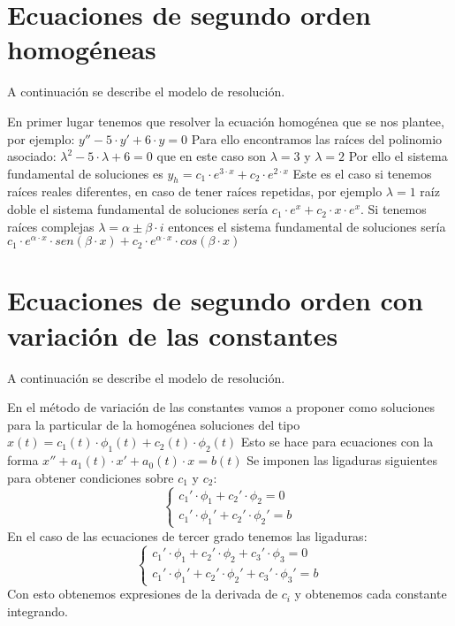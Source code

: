 
\section{Ecuaciones de segundo orden homogéneas}

\begin{ejer}
	A continuación se describe el modelo de resolución.
\end{ejer}
\begin{sol}
	En primer lugar tenemos que resolver la ecuación homogénea que se nos plantee, por ejemplo:  
	$y'' - 5\cdot y' + 6\cdot y = 0$  
	Para ello encontramos las raíces del polinomio asociado:  
	$\lambda ^2 - 5\cdot \lambda + 6 = 0$ que en este caso son $\lambda = 3$ y $\lambda  = 2$  
	Por ello el sistema fundamental de soluciones es $y_h = c_1\cdot e^{3\cdot x} + c_2\cdot e^{2\cdot x}$  
	Este es el caso si tenemos raíces reales diferentes, en caso de tener raíces repetidas, por ejemplo $\lambda = 1$ raíz doble el sistema fundamental de soluciones sería $c_1\cdot e^x + c_2\cdot x\cdot e^x$.  
	Si tenemos raíces complejas $\lambda = \alpha \pm \beta \cdot i$ entonces el sistema fundamental de soluciones sería $c_1\cdot e^{\alpha \cdot x}\cdot sen(\beta \cdot x) + c_2\cdot e^{\alpha \cdot x}\cdot cos(\beta \cdot x)$
\end{sol}


\section{Ecuaciones de segundo orden con variación de las constantes}

\begin{ejer}
	A continuación se describe el modelo de resolución.
\end{ejer}
\begin{sol}
	En el método de variación de las constantes vamos a proponer como soluciones para la particular de la homogénea soluciones del tipo $x(t) = c_1(t)\cdot \phi_1 (t) + c_2(t)\cdot \phi_2 (t)$  
	Esto se hace para ecuaciones con la forma $x'' + a_1 (t)\cdot x' + a_0 (t)\cdot x = b(t)$  
	Se imponen las ligaduras siguientes para obtener condiciones sobre $c_1$ y $c_2$:  
	$$
	\begin{cases}
	c_1'\cdot \phi_1 + c_2' \cdot \phi_2 = 0 \\
	c_1'\cdot \phi_1' + c_2'\cdot \phi_2' = b
	\end{cases}
	$$
	En el caso de las ecuaciones de tercer grado tenemos las ligaduras:  
	$$
	\begin{cases}
	c_1'\cdot \phi_1 + c_2'\cdot \phi_2 + c_3'\cdot \phi_3 = 0 \\
	c_1'\cdot \phi_1' + c_2'\cdot \phi_2' + c_3'\cdot \phi_3' = b
	\end{cases}
	$$
	Con esto obtenemos expresiones de la derivada de $c_i$ y obtenemos cada constante integrando.
\end{sol}

